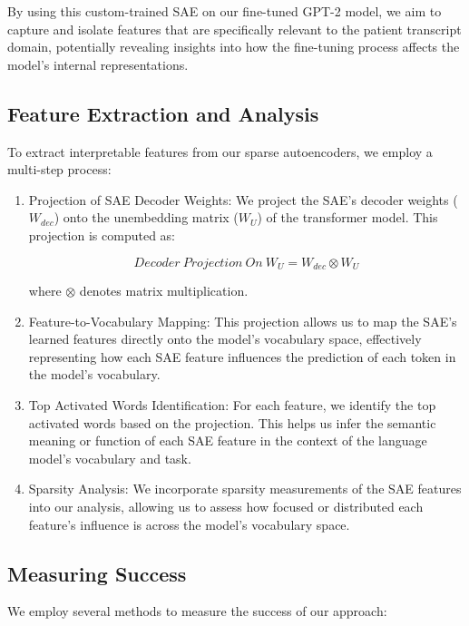 By using this custom-trained SAE on our fine-tuned GPT-2 model, we aim to capture and isolate features that are specifically relevant to the patient transcript domain, potentially revealing insights into how the fine-tuning process affects the model's internal representations.

\subsection{Feature Extraction and Analysis}

To extract interpretable features from our sparse autoencoders, we employ a multi-step process:

\begin{enumerate}
    \item Projection of SAE Decoder Weights: We project the SAE's decoder weights ($W_{dec}$) onto the unembedding matrix ($W_{U}$) of the transformer model. This projection is computed as:
    
        \[ Decoder\ Projection\ On\ W_{U} = W_{dec} \otimes W_{U} \]
    
        where $\otimes$ denotes matrix multiplication.
    
    \item Feature-to-Vocabulary Mapping: This projection allows us to map the SAE's learned features directly onto the model's vocabulary space, effectively representing how each SAE feature influences the prediction of each token in the model's vocabulary.
    
    \item Top Activated Words Identification: For each feature, we identify the top activated words based on the projection. This helps us infer the semantic meaning or function of each SAE feature in the context of the language model's vocabulary and task.
    
    \item Sparsity Analysis: We incorporate sparsity measurements of the SAE features into our analysis, allowing us to assess how focused or distributed each feature's influence is across the model's vocabulary space.
\end{enumerate}

\subsection{Measuring Success}

We employ several methods to measure the success of our approach:

